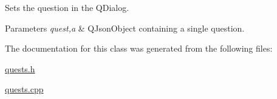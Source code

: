 Sets the question in the Q\+Dialog. 


\begin{DoxyParams}{Parameters}
{\em quest,a} & Q\+Json\+Object containing a single question. \\
\hline
\end{DoxyParams}


The documentation for this class was generated from the following files\+:\begin{DoxyCompactItemize}
\item 
\hyperlink{quests_8h}{quests.\+h}\item 
\hyperlink{quests_8cpp}{quests.\+cpp}\end{DoxyCompactItemize}
